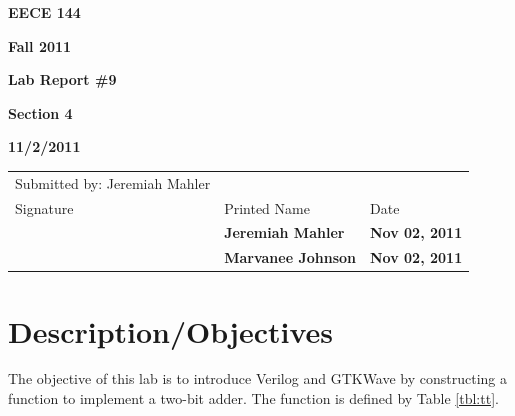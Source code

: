 \documentclass[12pt]{article}
\begin{document}
\centerline{\bf EECE 144}
\centerline{\bf Fall 2011}
\centerline{\bf}
\centerline{\bf Lab Report \#9}
\centerline{\bf Section 4}
\centerline{\bf 11/2/2011}
\begin{center}
\begin{tabularx}{\textwidth}[b]{X l l}
Submitted by: Jeremiah Mahler & & \\
Signature & Printed Name & Date \\
\hline
\multicolumn{1}{|X|}{} & \multicolumn{1}{|l|}{\bigstrut \bf Jeremiah Mahler} & \multicolumn{1}{|l|}{\bf Nov 02, 2011} \\
\hline
\multicolumn{1}{|X|}{} & \multicolumn{1}{|l|}{\bigstrut \bf Marvanee Johnson} & \multicolumn{1}{|l|}{\bf Nov 02, 2011} \\
\hline
\end{tabularx}
\end{center}

\section{Description/Objectives}

The objective of this lab is to introduce Verilog \cite{VERILOG}
and GTKWave \cite{GTKWAVE} by constructing a function to implement
a two-bit adder.  The function is defined by Table \ref{tbl:tt}.
\end{document}
